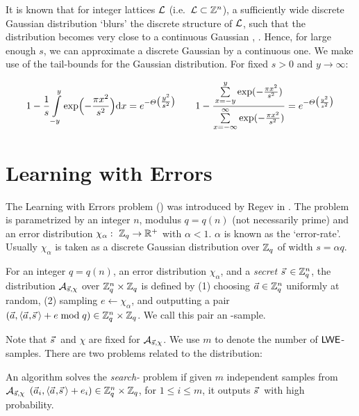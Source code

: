 It is known that for integer lattices  $\mathcal{L}$ (i.e.\  $\mathcal{L} \subset {{\mathbb Z}}^n$), a sufficiently wide discrete Gaussian distribution `blurs' the discrete structure of $\mathcal{L}$, such that the distribution becomes very close to a continuous Gaussian \cite{RSA:LinPei11}, \cite{EC:MicPei12}. Hence, for large enough $s$, we can approximate a discrete Gaussian by a continuous one. We make use of the tail-bounds for the Gaussian distribution. For fixed $s >0$ and $y \rightarrow \infty$:

\begin{equation}\label{eq:TailBound}
1-\frac{1}{s} \int\limits_{-y}^{y}\exp \Bigl(-\frac{\pi x^2}{s^2} \Bigr)\mathrm{d}x = e^{-\varTheta\bigl(\tfrac{y^2}{s^2}\bigr)}
\qquad
1-\frac{\sum\limits_{x=-y}^{y}\exp(-\frac{\pi x^2}{s^2})}{\sum\limits_{x=-\infty}^\infty \exp(-\frac{\pi x^2}{s^2})} = e^{-\varTheta\bigl(\frac{y^2}{s^2}\bigr)}
\end{equation} 

\section{Learning with Errors}   \label{sec:PrelinLWE}
The Learning with Errors problem (\LWE) was introduced by Regev in \cite{STOC:Regev05}. The \LWE problem is parametrized by an integer $n$, modulus $q = q(n)$ (not necessarily prime) and an error distribution $\chi_{\alpha}:~{{\mathbb Z}}_q \rightarrow {{\mathbb R}}^+$ with $\alpha <1$. $\alpha$ is known as the `error-rate'. Usually $\chi_{\alpha}$ is taken as a discrete Gaussian distribution over ${{\mathbb Z}}_q$ of width $s= \alpha q$. 
\begin{definition} \label{def:LWE}
For an integer $q = q(n)$, an error distribution $\chi_{\alpha}$, and a \emph{secret} $\svec \in \Z_q^n$, the \LWE distribution $\mathcal{A}_{\vec s, \chi}$ over ${{\mathbb Z}}_q^n \times {{\mathbb Z}}_q$ is defined by (1) choosing $\vec a \in {{\mathbb Z}}_q^n$ uniformly at random, (2) sampling $e \leftarrow \chi_{\alpha}$, and outputting a pair $(\avec, \ScProd{\avec}{\svec} + e \bmod q) \in \Z_q^n \times \Z_q$. We call this pair an \LWE-sample.
\end{definition}

Note that $\svec$ and $\chi$ are fixed for $\mathcal{A}_{\vec s, \chi}$. We use $m$ to denote the number of $\textsf{LWE}$-samples. There are two problems related to the \LWE distribution:

\begin{definition} \label{def:searchLWE}
	An algorithm solves the \emph{search-\LWE} problem if given $m$ independent \LWE samples from $\mathcal{A}_{\vec s, \chi}$ $(\avec_i, \ScProd{\avec}{\svec}+e_i) \in \Z_q^n \times \Z_q$, for $1 \leq i \leq m$, it outputs $\svec$ with high probability. 
\end{definition}

